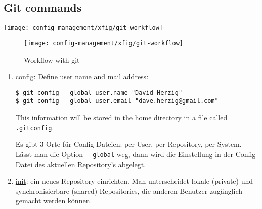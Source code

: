 \subsection{Git commands}
\ifslides
\begin{center}
  \texttt{[image: config-management/xfig/git-workflow]}
\end{center}
\else
\begin{figure}[H]
\centering
  \texttt{[image: config-management/xfig/git-workflow]}
\caption{Workflow with git}
\end{figure}
\fi
\begin{enumerate}
\item \underline{config}: Define user name and mail address:
  \begin{lstlisting}
$ git config --global user.name "David Herzig"
$ git config --global user.email "dave.herzig@gmail.com"
  \end{lstlisting}
This information will be stored in the home directory in a file called
\verb+.gitconfig+.

Es gibt 3 Orte für
Config-Dateien: per User, per Repository, per System. Lässt man
die
Option \verb+--global+ weg, dann wird die Einstellung in der
Config-Datei des aktuellen Repository's abgelegt.
%
\newslide
\item \underline{init}: ein neues Repository einrichten. Man
  unterscheidet lokale (private) und synchronisierbare (shared)
  Repositories, die anderen Benutzer zugänglich gemacht werden können.


\end{enumerate}
